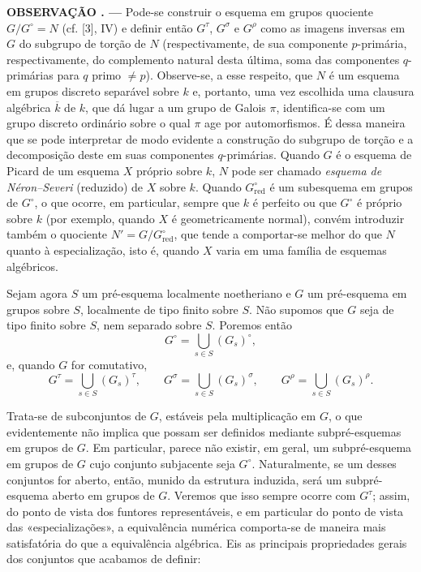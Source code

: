 \documentclass[11pt,twoside,openany]{book}
\numberwithin{equation}{section}
\newcommand{\src}[1]{%
  \phantomsection\hypertarget{src:#1}{}%
  \marginpar{\raggedleft\footnotesize\sffamily #1}%
}
\theoremstyle{plain}
\theoremstyle{definition}
\theoremstyle{remark}
\newcommand{\result}[2]{%
  \par\medskip\noindent\textbf{#1%
  \if\relax\detokenize{#2}\relax\else\space#2\fi. ---}\enspace
}
\newcommand{\FgaUnitKey}{frontmatter}
\renewcommand{\src}[1]{%
  \phantomsection\hypertarget{src:\FgaUnitKey:#1}{}%
  \marginpar{\raggedleft\footnotesize\sffamily #1}%
}
\begin{document}
\result{OBSERVAÇÃO}{} Pode-se construir o esquema em grupos quociente
$G/G^\circ=N$ (cf. [3], IV) e definir então $G^\tau$, $G^\sigma$ e
$G^\rho$ como as imagens inversas em $G$ do subgrupo de torção de $N$
(respectivamente, de sua componente $p$-primária, respectivamente, do
complemento natural desta última, soma das componentes $q$-primárias para
$q$ primo $\neq p$).
Observe-se, a esse respeito, que $N$ é um esquema em grupos discreto separável
sobre $k$ e, portanto, uma vez escolhida uma clausura algébrica $\overline k$
de $k$, que dá lugar a um grupo de Galois $\pi$, identifica-se com um grupo
discreto ordinário sobre o qual $\pi$ age por automorfismos. É dessa maneira
que se pode interpretar de modo evidente a construção do subgrupo de torção e
a decomposição deste em suas componentes $q$-primárias. Quando $G$ é o esquema
de Picard de um esquema $X$ próprio sobre $k$, $N$ pode ser chamado
\emph{esquema de Néron--Severi} (reduzido) de $X$ sobre $k$. Quando
$G^\circ_{\mathrm{red}}$ é um subesquema em grupos de $G^\circ$, o que
ocorre, em particular, sempre que $k$ é perfeito ou que $G^\circ$ é próprio
sobre $k$ (por exemplo, quando $X$ é geometricamente normal), convém introduzir
também o quociente $N'=G/G^\circ_{\mathrm{red}}$, que tende a comportar-se
melhor do que $N$ quanto à especialização, isto é, quando $X$ varia em uma
família de esquemas algébricos.

Sejam agora $S$ um pré-esquema localmente noetheriano e $G$ um pré-esquema em
grupos sobre $S$, localmente de tipo finito sobre $S$. Não supomos que $G$ seja
de tipo finito sobre $S$, nem separado sobre $S$. Poremos então
\[
G^\circ=\bigcup_{s\in S}(G_s)^\circ,
\]
e, quando $G$ for comutativo,
\[
G^\tau=\bigcup_{s\in S}(G_s)^\tau,
\qquad
G^\sigma=\bigcup_{s\in S}(G_s)^\sigma,
\qquad
G^\rho=\bigcup_{s\in S}(G_s)^\rho.
\]
\src{224}
Trata-se de subconjuntos de $G$, estáveis pela multiplicação em $G$, o que
evidentemente não implica que possam ser definidos mediante subpré-esquemas em
grupos de $G$. Em particular, parece não existir, em geral, um subpré-esquema
em grupos de $G$ cujo conjunto subjacente seja $G^\circ$. Naturalmente, se um
desses conjuntos for aberto, então, munido da estrutura induzida, será um
subpré-esquema aberto em grupos de $G$. Veremos que isso sempre ocorre com
$G^\tau$; assim, do ponto de vista dos funtores representáveis, e em particular
do ponto de vista das «especializações», a equivalência numérica comporta-se
de maneira mais satisfatória do que a equivalência algébrica. Eis as principais
propriedades gerais dos conjuntos que acabamos de definir:
\end{document}
